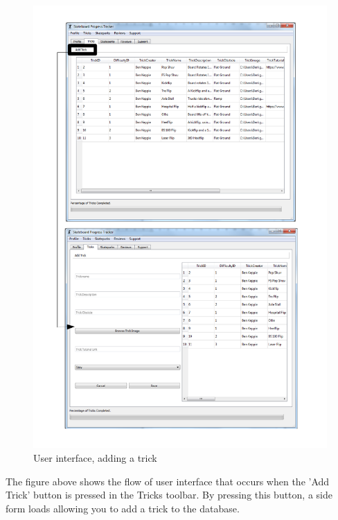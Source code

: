 \begin{figure}[H]
    \includegraphics[width=\textwidth]{./Maintenance/Figures/AddTrick.pdf}
    \caption{User interface, adding a trick} \label{fig:Add Trick UI}
\end{figure}

The figure above shows the flow of user interface that occurs when the 'Add Trick' button is pressed in the Tricks toolbar. By pressing this button, a side form loads allowing you to add a trick to the database.


